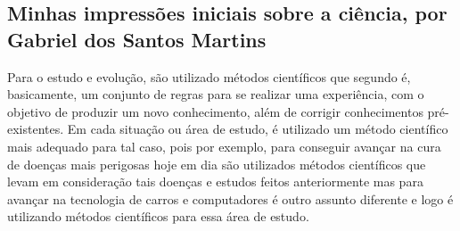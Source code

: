\subsection{Minhas impressões iniciais sobre a ciência, por Gabriel dos Santos Martins}


Para o estudo e evolução, são utilizado métodos científicos que segundo \citep{gnipper_o_nodate} é, basicamente, um conjunto de regras para se realizar uma experiência, com o objetivo de produzir um novo conhecimento, além de corrigir conhecimentos pré-existentes.
Em cada situação ou área de estudo, é utilizado um método científico mais adequado para tal caso, pois por exemplo, para conseguir avançar na cura de doenças mais perigosas hoje em dia são utilizados métodos científicos que levam em consideração tais doenças e estudos feitos anteriormente mas para avançar na tecnologia de carros e computadores é outro assunto diferente e logo é utilizando métodos científicos para essa área de estudo. 
